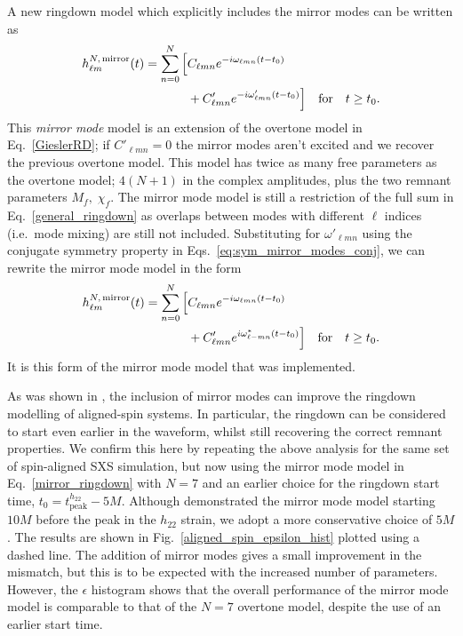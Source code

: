 A new ringdown model which explicitly includes the mirror modes can be written as
\begin{align}
    h_{\ell m}^{N,\, {\rm mirror}}(t) = \sum_{n=0}^N \Big[& C_{\ell m n} e^{-i \omega_{\ell m n}(t-t_0)} \\ &+ C'_{\ell m n} e^{-i \omega'_{\ell m n}(t-t_0)} \Big]\quad \textrm{for} \quad t \geq t_0. \nonumber
\end{align}
This \emph{mirror mode} model is an extension of the overtone model in Eq.~\ref{GieslerRD};
if $C'_{\ell m n} = 0$ the mirror modes aren't excited and we recover the previous overtone model. 
This model has twice as many free parameters as the overtone model; $4(N+1)$ in the complex amplitudes, plus the two remnant parameters $M_f,\; \chi_f$.
The mirror mode model is still a restriction of the full sum in Eq.~\ref{general_ringdown} as overlaps between modes with different $\ell$ indices (i.e.\ mode mixing) are still not included.
Substituting for $\omega'_{\ell m n}$ using the conjugate symmetry property in Eqs.~\ref{eq:sym_mirror_modes_conj}, we can rewrite the mirror mode model in the form
\begin{align} \label{mirror_ringdown}
   h_{\ell m}^{N,\, {\rm mirror}}(t) = \sum_{n=0}^N \Big[& C_{\ell m n} e^{-i \omega_{\ell m n}(t-t_0)} \\ &+ C'_{\ell m n} e^{i \omega^*_{\ell -m n}(t-t_0)} \Big]\quad \textrm{for} \quad t \geq t_0. \nonumber
\end{align}
It is this form of the mirror mode model that was implemented.

As was shown in \cite{mirror_modes}, the inclusion of mirror modes can improve the ringdown modelling of aligned-spin systems. In particular, the ringdown can be considered to start even earlier in the waveform, whilst still recovering the correct remnant properties. We confirm this here by repeating the above analysis for the same set of spin-aligned SXS simulation, but now using the mirror mode model in Eq.~\ref{mirror_ringdown} with $N=7$ and an earlier choice for the ringdown start time, $t_0 = t_{\mathrm{peak}}^{h_{22}} - 5M$.
Although \cite{mirror_modes} demonstrated the mirror mode model starting $10M$ before the peak in the $h_{22}$ strain, we adopt a more conservative choice of $5M$.
The results are shown in Fig.~\ref{aligned_spin_epsilon_hist} plotted using a dashed line. 
The addition of mirror modes gives a small improvement in the mismatch, but this is to be expected with the increased number of parameters.
However, the $\epsilon$ histogram shows that the overall performance of the mirror mode model is comparable to that of the $N=7$ overtone model, despite the use of an earlier start time.


